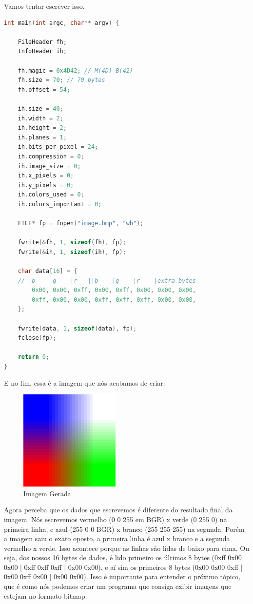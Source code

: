 \documentclass[a4paper,oneside,12pt]{article}
\begin{document}
Vamos tentar escrever isso.
\begin{lstlisting}[language=C, caption=Escrevendo um Bitmap]
int main(int argc, char** argv) {

    FileHeader fh;
    InfoHeader ih;

    fh.magic = 0x4D42; // M(4D) B(42)
    fh.size = 70; // 70 bytes
    fh.offset = 54;

    ih.size = 40;
    ih.width = 2;
    ih.height = 2;
    ih.planes = 1;
    ih.bits_per_pixel = 24;
    ih.compression = 0;
    ih.image_size = 0;
    ih.x_pixels = 0;
    ih.y_pixels = 0;
    ih.colors_used = 0;
    ih.colors_important = 0;

    FILE* fp = fopen("image.bmp", "wb");

    fwrite(&fh, 1, sizeof(fh), fp);
    fwrite(&ih, 1, sizeof(ih), fp);

    char data[16] = {
    // |b    |g    |r   ||b    |g    |r    |extra bytes
        0x00, 0x00, 0xff, 0x00, 0xff, 0x00, 0x00, 0x00,
        0xff, 0x00, 0x00, 0xff, 0xff, 0xff, 0x00, 0x00,
    };

    fwrite(data, 1, sizeof(data), fp);
    fclose(fp);

    return 0;
}
\end{lstlisting}

E no fim, essa é a imagem que nós acabamos de criar:
\begin{figure}[h]
    \centering
    \includegraphics[width=5cm]{media/image.png}
    \caption{Imagem Gerada}
\end{figure}
\break

Agora perceba que os dados que escrevemos é diferente do resultado final da imagem.
Nós escrevemos vermelho (0 0 255 em BGR) x verde (0 255 0) na primeira linha, e azul (255 0 0 BGR) x branco (255 255 255) na segunda. Porém a imagem saiu o exato oposto, a primeira linha é azul x branco e a segunda vermelho x verde. Isso acontece porque as linhas são lidas de baixo para cima.
Ou seja, dos nossos 16 bytes de dados, é lido primeiro os últimos 8 bytes (0xff 0x00 0x00 | 0xff 0xff 0xff | 0x00 0x00), e aí sim os primeiros 8 bytes (0x00 0x00 0xff | 0x00 0xff 0x00 | 0x00 0x00).
Isso é importante para entender o próximo tópico, que é como nós podemos criar um programa que consiga exibir imagens que estejam no formato bitmap.
\end{document}

